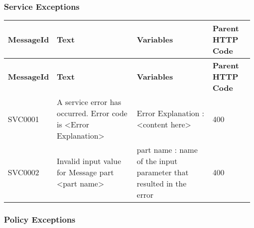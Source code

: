 \subsubsection{Service Exceptions}

\begin{comment}
List the service exceptions generated by the operation (indicate any
variation that exists across different versions):
\end{comment}


\begin{longtable}{|>{\raggedright}p{}|>{\raggedright}p{}|>{\raggedright}p{}|>{\raggedright}p{}|}
\hline
\hline 
\textbf{\footnotesize{MessageId}} & \textbf{\footnotesize{Text}} & \textbf{\footnotesize{Variables}} & \textbf{\footnotesize{Parent HTTP Code}}\tabularnewline
\hline 
\hline
\endfirsthead
\hline
\hline 
\textbf{\footnotesize{MessageId}} & \textbf{\footnotesize{Text}} & \textbf{\footnotesize{Variables}} & \textbf{\footnotesize{Parent HTTP Code}}\tabularnewline
\hline 
\hline
\endhead
\hline 
{\footnotesize{SVC0001}} & {\footnotesize{A service error has occurred. Error code is <Error
Explanation>}} & {\footnotesize{Error Explanation : <content here>}} & {\footnotesize{400}}\tabularnewline
\hline 
{\footnotesize{SVC0002}} & {\footnotesize{Invalid input value for Message part <part name>}} & {\footnotesize{part name : name of the input parameter that resulted
in the error}} & {\footnotesize{400}}\tabularnewline
\hline 
\end{longtable}




\subsubsection{Policy Exceptions}

\begin{comment}
List the policy exceptions generated by the operation (indicate any
variation that exists across different versions):
\end{comment}


